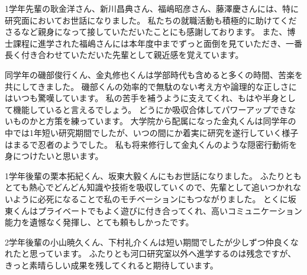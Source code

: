 1学年先輩の耿金洋さん、新川昌典さん、福嶋昭彦さん、藤澤慶さんには、特に研究面においてお世話になりました。
私たちの就職活動も積極的に助けてくださるなど親身になって接していただいたことにも感謝しております。
また、博士課程に進学された福嶋さんには本年度中までずっと面倒を見ていただき、一番長く付き合わせていただいた先輩として親近感を覚えています。

同学年の磯部俊行くん、金丸修也くんは学部時代も含めると多くの時間、苦楽を共にしてきました。
磯部くんの効率的で無駄のない考え方や論理的な正しさにはいつも驚嘆しています。
私の苦手を補うように支えてくれ、もはや半身として機能していると言えるでしょう。
どうにか吸収合体してパワーアップできないものかと方策を練っています。
大学院から配属になった金丸くんは同学年の中では1年短い研究期間でしたが、いつの間にか着実に研究を遂行していく様子はまるで忍者のようでした。
私も将来修行して金丸くんのような隠密行動術を身につけたいと思います。

1学年後輩の栗本拓紀くん、坂東大毅くんにもお世話になりました。
ふたりともとても熱心でどんどん知識や技術を吸収していくので、先輩として追いつかれないように必死になることで私のモチベーションにもつながりました。
とくに坂東くんはプライベートでもよく遊びに付き合ってくれ、高いコミュニケーション能力を遺憾なく発揮し、とても頼もしかったです。

2学年後輩の小山暁久くん、下村礼介くんは短い期間でしたが少しずつ仲良くなれたと思っています。
ふたりとも河口研究室以外へ進学するのは残念ですが、きっと素晴らしい成果を残してくれると期待しています。

